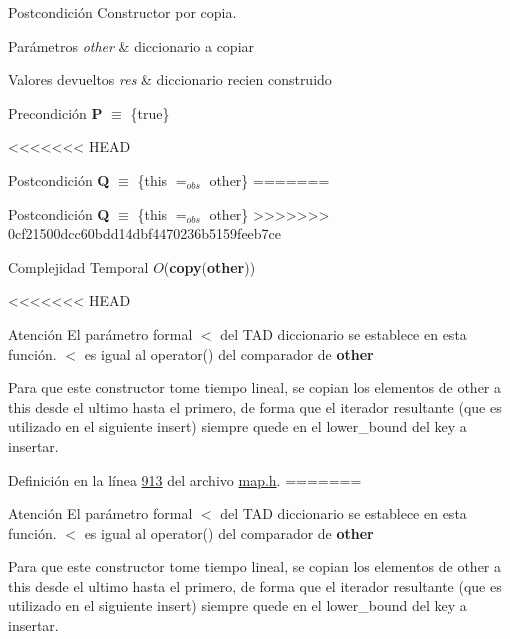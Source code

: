 \begin{DoxyPostcond}{\-Postcondición}
Constructor por copia. 


\begin{DoxyParams}{Parámetros}
{\em other} & diccionario a copiar \\
\hline
\end{DoxyParams}

\begin{DoxyRetVals}{Valores devueltos}
{\em res} & diccionario recien construido\\
\hline
\end{DoxyRetVals}
\begin{DoxyPrecond}{Precondición}
{\bfseries P} $\equiv$ \{true\} 
\end{DoxyPrecond}
<<<<<<< HEAD
\begin{DoxyPostcond}{\-Postcondición}
{\bfseries \-Q} $\equiv$ \{this $=_{obs}$ other\}
=======
\begin{DoxyPostcond}{Postcondición}
{\bfseries Q} $\equiv$ \{this $=_{obs}$ other\}
>>>>>>> 0cf21500dcc60bdd14dbf4470236b5159feeb7ce
\end{DoxyPostcond}

\begin{DoxyDescription}
\item[Complejidad Temporal]$O$({\bfseries copy}({\bfseries other}))
\end{DoxyDescription}

<<<<<<< HEAD
\begin{DoxyAttention}{\-Atención}
\-El parámetro formal $<$ del \-T\-A\-D diccionario se establece en esta función. $<$ es igual al operator() del comparador de {\bfseries other}
\end{DoxyAttention}
\-Para que este constructor tome tiempo lineal, se copian los elementos de other a this desde el ultimo hasta el primero, de forma que el iterador resultante (que es utilizado en el siguiente insert) siempre quede en el lower\-\_\-bound del key a insertar. 

\-Definición en la línea \hyperlink{map_8h_source_l00913}{913} del archivo \hyperlink{map_8h_source}{map.\-h}.
=======
\begin{DoxyAttention}{Atención}
El parámetro formal $<$ del T\+AD diccionario se establece en esta función. $<$ es igual al operator() del comparador de {\bfseries other}
\end{DoxyAttention}
Para que este constructor tome tiempo lineal, se copian los elementos de other a this desde el ultimo hasta el primero, de forma que el iterador resultante (que es utilizado en el siguiente insert) siempre quede en el lower\+\_\+bound del key a insertar. 


\end{DoxyPostcond}
\end{DoxyPostcond}
